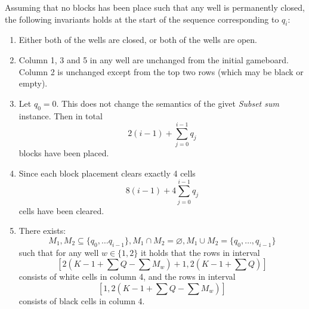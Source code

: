 Assuming that no blocks has been place such that any well is permanently closed, the following invariants holds at the start of the sequence corresponding to $q_i$:

\begin{enumerate}
\item Either both of the wells are closed, or both of the wells are open.

\item Column 1, 3 and 5 in any well are unchanged from the initial gameboard. Column 2 is unchanged except from the top two rows (which may be black or empty).

\item Let $q_0 = 0$. This does not change the semantics of the givet \textit{Subset sum} instance. Then in total 
\begin{equation*}
    2 \left( i-1 \right) + \sum_{j=0}^{i-1} q_j
\end{equation*}
blocks have been placed.

\item Since each block placement clears exactly 4 cells
\begin{equation*}
    8 \left( i-1 \right) + 4 \sum_{j=0}^{i-1} q_j
\end{equation*}
cells have been cleared.

\item There exists: 
    \begin{equation*}
        M_1, M_2 \subseteq \{q_0, \ldots q_{i-1}\}, M_1 \cap M_2 = \varnothing, M_1 \cup M_2 = \{q_0, \ldots, q_{i-1}\}
    \end{equation*}
such that for any well $w \in \{1,2\}$ it holds that the rows in interval
    \begin{equation*}
        \left[ 2 \left( K-1 + \sum Q - \sum M_w \right) +1, 2 \left( K-1 + \sum Q \right) \right]
    \end{equation*}
consists of white cells in column 4, and the rows in interval
    \begin{equation*}
        \left[ 1, 2 \left( K-1 + \sum Q - \sum M_w \right) \right]
    \end{equation*}
consists of black cells in column 4.
\end{enumerate}

